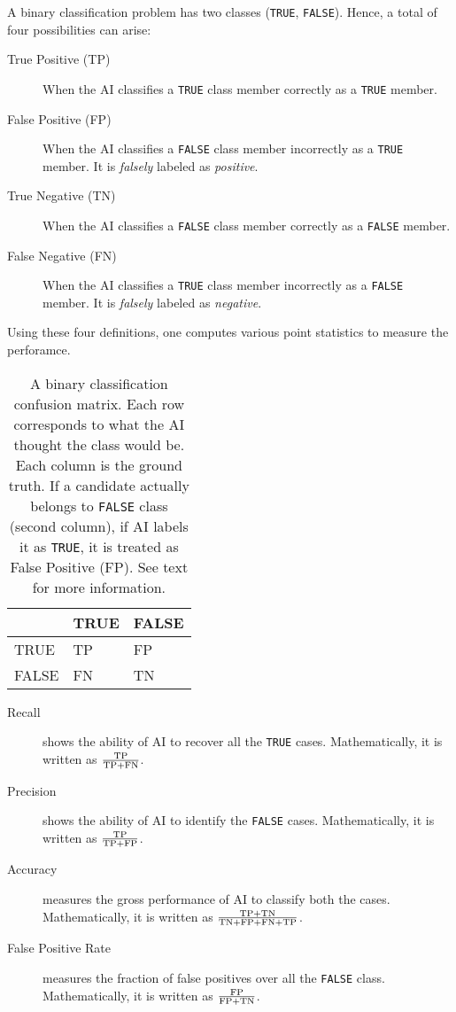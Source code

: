 \par A binary classification problem has two classes (\texttt{TRUE}, \texttt{FALSE}). Hence, a total of four possibilities can arise:
\begin{description}
	\item[True Positive (TP)] 
		When the AI classifies a \texttt{TRUE} class member correctly as a \texttt{TRUE} member.
	\item[False Positive (FP)] 
		When the AI classifies a \texttt{FALSE} class member incorrectly as a \texttt{TRUE} member. It is \emph{falsely} labeled as \emph{positive}.
	\item[True Negative (TN)] 
		When the AI classifies a \texttt{FALSE} class member correctly as a \texttt{FALSE} member.
	\item[False Negative (FN)] 
		When the AI classifies a \texttt{TRUE} class member incorrectly as a \texttt{FALSE} member. It is \emph{falsely} labeled as \emph{negative}.
\end{description}
Using these four definitions, one computes various point statistics to measure the perforamce.
\begin{table}[]
	\label{tab:cfm}
	\begin{tabular}{@{}lll@{}}
		\toprule
		 & TRUE & FALSE \\ \midrule
		TRUE & TP & FP \\
		FALSE & FN & TN \\ \bottomrule
	\end{tabular}
	\caption {A binary classification confusion matrix. Each row corresponds to what the AI thought the class would be. Each column is the ground truth. 
		If a candidate actually belongs to \texttt{FALSE} class (second column), if AI labels it as \texttt{TRUE}, it is treated as False Positive (FP). See text for more information.
	}
\end{table}

\begin{description}
	\item[Recall]
		shows the ability of AI to recover all the \texttt{TRUE} cases. Mathematically, it is written as $\frac{\rm TP}{\rm TP + FN}$.
	\item[Precision]
		shows the ability of AI to identify the \texttt{FALSE} cases. Mathematically, it is written as $\frac{\rm TP}{\rm TP + FP}$.
	\item[Accuracy]
		measures the gross performance of AI to classify both the cases. Mathematically, it is written as $\frac{\rm TP+TN}{\rm TN+FP+FN+TP}$.
	\item[False Positive Rate]
		measures the fraction of false positives over all the \texttt{FALSE} class. Mathematically, it is written as $\frac{\rm FP}{\rm FP+TN}$.
\end{description}

